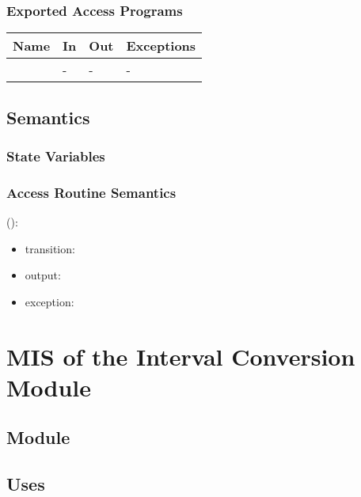 \documentclass[12pt, titlepage]{article}
\begin{document}
\subsubsection{Exported Access Programs}

\begin{center}
	\begin{tabular}{p{3cm} p{4cm} p{4cm} p{2cm}}
		\hline
		\textbf{Name} & \textbf{In} & \textbf{Out} & \textbf{Exceptions} \\
		\hline
		\wss{accessProg} & - & - & - \\
		\hline
	\end{tabular}
\end{center}

\subsection{Semantics}

\subsubsection{State Variables}


\subsubsection{Access Routine Semantics}

\noindent {}():
\begin{itemize}
	\item transition:  
	\item output:  
	\item exception:  
\end{itemize}

\newpage

\section{MIS of the Interval Conversion Module} 
\label{Module_intervalconversion}

\subsection{Module}


\subsection{Uses}
\end{document}
